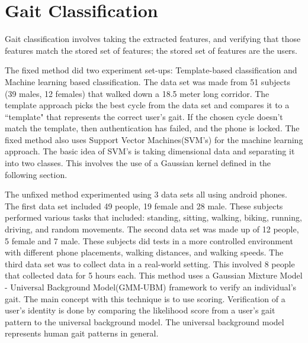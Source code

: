 \documentclass{sig-alternate}
\begin{document}
\section{Gait Classification}
	Gait classification involves taking the extracted features, and verifying that those features match the stored set of features; the stored set of features are the users. 
	
	
	The fixed method did two experiment set-ups: Template-based classification and Machine learning based classification. The data set was made from 51 subjects (39 males, 12 females) that walked down a 18.5 meter long corridor. The template approach picks the best cycle from the data set and compares it to a ``template" that represents the correct user's gait. If the chosen cycle doesn't match the template, then authentication has failed, and the phone is locked.  The fixed method also uses Support Vector Machines(SVM's) for the machine learning approach. The basic idea of SVM's is taking dimensional data and separating it into two classes. This involves the use of a Gaussian kernel defined in the following section. 
	
	
	The unfixed method experimented using 3 data sets all using android phones. The first data set included 49 people, 19 female and 28 male. These subjects performed various tasks that included: standing, sitting, walking, biking, running, driving, and random movements. The second data set was made up of 12 people, 5 female and 7 male. These subjects did tests in a more controlled environment with different phone placements, walking distances, and walking speeds. The third data set was to collect data in a real-world setting. This involved 8 people that collected data for 5 hours each. This method uses a Gaussian Mixture Model - Universal Background Model(GMM-UBM) framework to verify an individual's gait. The main concept with this technique is to use scoring. Verification of a user's identity is done by comparing the likelihood score from a user's gait pattern to the universal background model. The universal background model represents human gait patterns in general.


	
\end{document}

